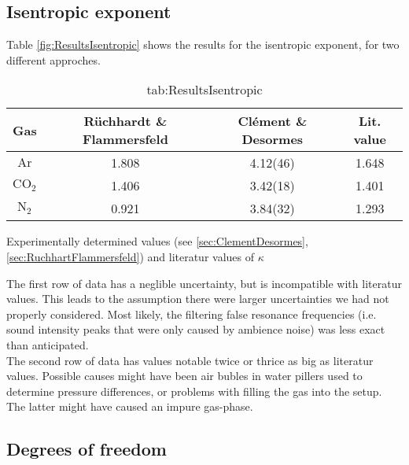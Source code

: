 \documentclass[../main.tex]{subfiles}
\begin{document}
    \subsection{Isentropic exponent}
        Table \ref{fig:ResultsIsentropic} shows the results for the isentropic exponent, for two different approches.
        \begin{table}[H]
            \centering
            \begin{tabular}{c|cc|c}
                \textbf{Gas} & \textbf{Rüchhardt \& Flammersfeld} & \textbf{Clément \& Desormes} & \textbf{Lit. value}\\
                \hline
                $\text{Ar}$ & 1.808 & 4.12(46)  & 1.648\\
                $\text{CO}_2$ & 1.406 & 3.42(18) & 1.401\\
                $\text{N}_2$ & 0.921 & 3.84(32) & 1.293\\
            \end{tabular}
            \caption{Experimentally determined values (see \ref{sec:ClementDesormes}, \ref{sec:RuchhartFlammersfeld}) and literatur values of $\kappa$}
            \caption{tab:ResultsIsentropic}
        \end{table}
        \noindent The first row of data has a neglible uncertainty, but is incompatible with literatur values. This leads to the assumption there were larger uncertainties we had not properly considered. Most likely, the filtering false resonance frequencies (i.e. sound intensity peaks that were only caused by ambience noise) was less exact than anticipated.\\

        \noindent The second row of data has values notable twice or thrice as big as literatur values. Possible causes might have been air bubles in water pillers used to determine pressure differences, or problems with filling the gas into the setup. The latter might have caused an impure gas-phase.

        

    \subsection{Degrees of freedom}
\end{document}

